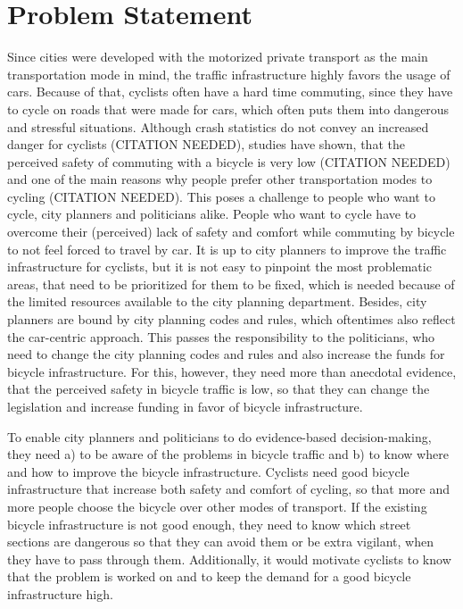 \section{Problem Statement}
\label{sec:problem}
Since cities were developed with the motorized private transport as the main transportation mode in mind, the traffic infrastructure highly favors the usage of cars.
Because of that, cyclists often have a hard time commuting, since they have to cycle on roads that were made for cars, which often puts them into dangerous and stressful situations.
Although crash statistics do not convey an increased danger for cyclists (CITATION NEEDED), studies have shown, that the perceived safety of commuting with a bicycle is very low (CITATION NEEDED) and one of the main reasons why people prefer other transportation modes to cycling (CITATION NEEDED).
This poses a challenge to people who want to cycle, city planners and politicians alike.
People who want to cycle have to overcome their (perceived) lack of safety and comfort while commuting by bicycle to not feel forced to travel by car. 
It is up to city planners to improve the traffic infrastructure for cyclists, but it is not easy to pinpoint the most problematic areas, that need to be prioritized for them to be fixed, which is needed because of the limited resources available to the city planning department.
Besides, city planners are bound by city planning codes and rules, which oftentimes also reflect the car-centric approach.
This passes the responsibility to the politicians, who need to change the city planning codes and rules and also increase the funds for bicycle infrastructure.
For this, however, they need more than anecdotal evidence, that the perceived safety in bicycle traffic is low, so that they can change the legislation and increase funding in favor of bicycle infrastructure.

To enable city planners and politicians to do evidence-based decision-making, they need a) to be aware of the problems in bicycle traffic and b) to know where and how to improve the bicycle infrastructure.
Cyclists need good bicycle infrastructure that increase both safety and comfort of cycling, so that more and more people choose the bicycle over other modes of transport.
If the existing bicycle infrastructure is not good enough, they need to know which street sections are dangerous so that they can avoid them or be extra vigilant, when they have to pass through them.
Additionally, it would motivate cyclists to know that the problem is worked on and to keep the demand for a good bicycle infrastructure high. 

